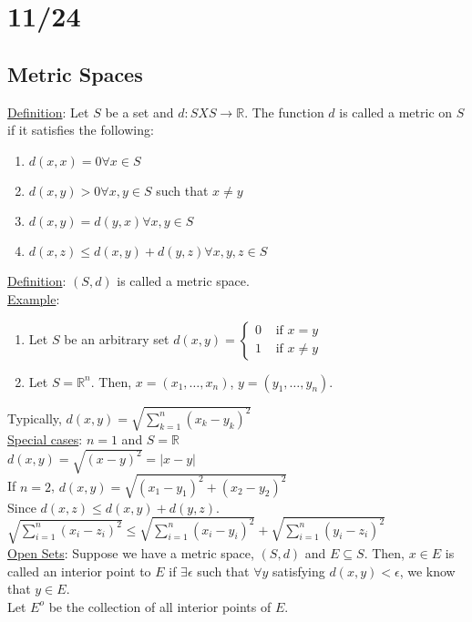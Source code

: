 \documentclass[11pt]{article}
\begin{document}
	\section*{11/24}
	\subsection*{Metric Spaces}
		\underline{Definition}: Let $S$ be a set and $d: S X S \to \mathbb{R}$.
		The function $d$ is called a metric on $S$ if it satisfies the following:
		\begin{enumerate}
			\item $d(x,x) = 0 \forall x \in S$
			\item $d(x,y) > 0 \forall x,y \in S$ such that $x \not= y$
			\item $d(x,y) = d(y, x) \forall x,y \in S$
			\item $d(x,z) \le d(x,y) + d(y,z) \forall x,y,z \in S$
		\end{enumerate}
		\underline{Definition}: $(S,d)$ is called a metric space.\\
		\underline{Example}: 
		\begin{enumerate}
		 	\item Let $S$ be an arbitrary set $d(x,y) = \begin{cases}
				0 & \text{ if } x = y \\ 1 & \text{ if } x \not= y\end{cases}$
			\item Let $S = \mathbb{R}^n$. Then, $x = (x_1, \ldots, x_n)$, $y = 
				(y_1, \ldots, y_n)$.
		\end{enumerate}
		Typically, $d(x,y) = \sqrt{\sum_{k=1}^n (x_k - y_k)^2}$\\
		\underline{Special cases}: $n = 1$ and $S = \mathbb{R}$\\
		$d(x,y) = \sqrt{(x-y)^2} = |x-y|$ \\
		If $n = 2$, $d(x,y) = \sqrt{(x_1 - y_1)^2 + (x_2 - y_2)^2}$\\
		Since $d(x,z) \le d(x,y) + d(y,z)$.\\
		$\sqrt{\sum_{i = 1}^n (x_i - z_i)^2} \le \sqrt{\sum_{i = 1}^n 
		(x_i - y_i)^2} + \sqrt{\sum_{i = 1}^n (y_i - z_i)^2}$\\
	\underline{Open Sets}: Suppose we have a metric space, $(S,d)$ and 
		$E \subseteq S$. Then, $x \in E$ is called an interior point to $E$ if
		$\exists \epsilon$ such that $\forall y$ satisfying $d(x,y) < \epsilon$,
		we know that $y \in E$.\\
		Let $E^o$ be the collection of all interior points of $E$.\\
\end{document}
